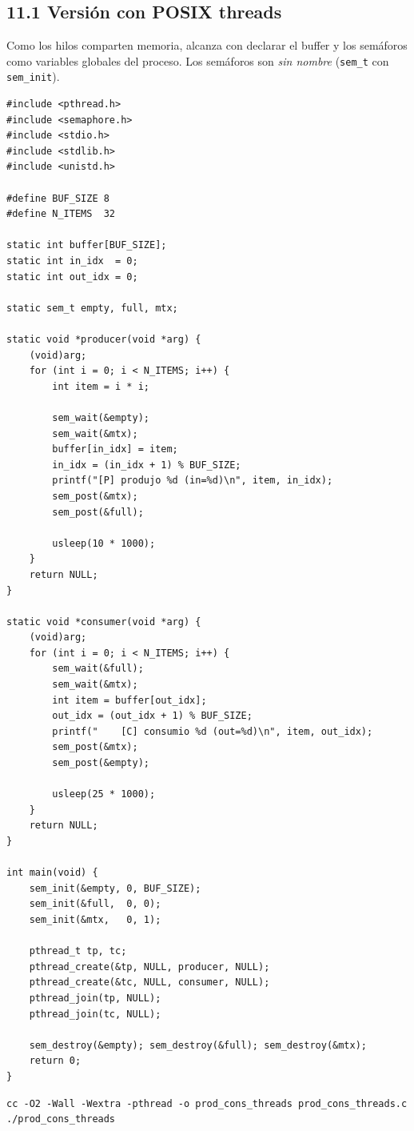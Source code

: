 \documentclass[11pt,a4paper]{article}
\begin{document}
\subsection*{11.1 Versión con POSIX threads}

Como los hilos comparten memoria, alcanza con declarar el buffer y los
semáforos como variables globales del proceso. Los semáforos son
\emph{sin nombre} (\texttt{sem\_t} con \texttt{sem\_init}).

\begin{lstlisting}[style=cstyle]
#include <pthread.h>
#include <semaphore.h>
#include <stdio.h>
#include <stdlib.h>
#include <unistd.h>

#define BUF_SIZE 8
#define N_ITEMS  32

static int buffer[BUF_SIZE];
static int in_idx  = 0;
static int out_idx = 0;

static sem_t empty, full, mtx;

static void *producer(void *arg) {
    (void)arg;
    for (int i = 0; i < N_ITEMS; i++) {
        int item = i * i;

        sem_wait(&empty);
        sem_wait(&mtx);
        buffer[in_idx] = item;
        in_idx = (in_idx + 1) % BUF_SIZE;
        printf("[P] produjo %d (in=%d)\n", item, in_idx);
        sem_post(&mtx);
        sem_post(&full);

        usleep(10 * 1000);
    }
    return NULL;
}

static void *consumer(void *arg) {
    (void)arg;
    for (int i = 0; i < N_ITEMS; i++) {
        sem_wait(&full);
        sem_wait(&mtx);
        int item = buffer[out_idx];
        out_idx = (out_idx + 1) % BUF_SIZE;
        printf("    [C] consumio %d (out=%d)\n", item, out_idx);
        sem_post(&mtx);
        sem_post(&empty);

        usleep(25 * 1000);
    }
    return NULL;
}

int main(void) {
    sem_init(&empty, 0, BUF_SIZE);
    sem_init(&full,  0, 0);
    sem_init(&mtx,   0, 1);

    pthread_t tp, tc;
    pthread_create(&tp, NULL, producer, NULL);
    pthread_create(&tc, NULL, consumer, NULL);
    pthread_join(tp, NULL);
    pthread_join(tc, NULL);

    sem_destroy(&empty); sem_destroy(&full); sem_destroy(&mtx);
    return 0;
}
\end{lstlisting}

\begin{lstlisting}
cc -O2 -Wall -Wextra -pthread -o prod_cons_threads prod_cons_threads.c
./prod_cons_threads
\end{lstlisting}
\end{document}
